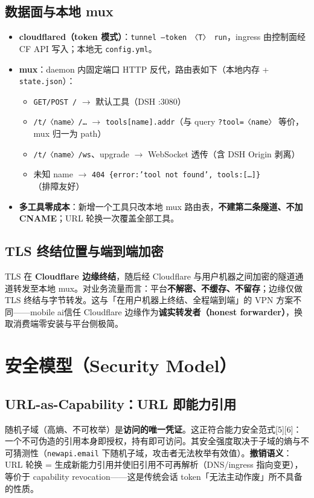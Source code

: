 \documentclass[10pt,a4paper]{article}
\newcommand{\sys}{mobile ai}
\begin{document}
\subsection{数据面与本地 mux}
\begin{itemize}[leftmargin=1.6em,itemsep=0.2em,topsep=0.2em]
  \item \textbf{cloudflared（token 模式）}：\texttt{tunnel --token 〈T〉 run}，ingress 由控制面经 CF API 写入；本地无 \texttt{config.yml}。
  \item \textbf{mux}：daemon 内固定端口 HTTP 反代，路由表如下（本地内存 + \texttt{state.json}）：
    \begin{itemize}[leftmargin=1.4em,itemsep=0.1em,topsep=0.2em]
      \item \texttt{GET/POST /} $\rightarrow$ 默认工具（DSH :3080）
      \item \texttt{/t/〈name〉/\ldots} $\rightarrow$ \texttt{tools[name].addr}（与 query \texttt{?tool=〈name〉} 等价，mux 归一为 path）
      \item \texttt{/t/〈name〉/ws}、upgrade $\rightarrow$ WebSocket 透传（含 DSH Origin 剥离）
      \item 未知 name $\rightarrow$ \texttt{404 \{error:'tool not found', tools:[\ldots]\}}（排障友好）
    \end{itemize}
  \item \textbf{多工具零成本}：新增一个工具只改本地 mux 路由表，\textbf{不建第二条隧道、不加 CNAME}；URL 轮换一次覆盖全部工具。
\end{itemize}

\subsection{TLS 终结位置与端到端加密}
TLS 在 \textbf{Cloudflare 边缘终结}，随后经 Cloudflare 与用户机器之间加密的隧道通道转发至本地 mux。对业务流量而言：平台\textbf{不解密、不缓存、不留存}；边缘仅做 TLS 终结与字节转发。这与「在用户机器上终结、全程端到端」的 VPN 方案不同——\sys 信任 Cloudflare 边缘作为\textbf{诚实转发者（honest forwarder）}，换取消费端零安装与平台侧极简。

\section{安全模型（Security Model）}

\subsection{URL-as-Capability：URL 即能力引用}
随机子域（高熵、不可枚举）是\textbf{访问的唯一凭证}。这正符合能力安全范式[5][6]：一个不可伪造的引用本身即授权，持有即可访问。其安全强度取决于子域的熵与不可猜测性（\texttt{newapi.email} 下随机子域，攻击者无法枚举有效值）。\textbf{撤销语义}：URL 轮换 = 生成新能力引用并使旧引用不可再解析（DNS/ingress 指向变更），等价于 capability revocation——这是传统会话 token「无法主动作废」所不具备的性质。
\end{document}
